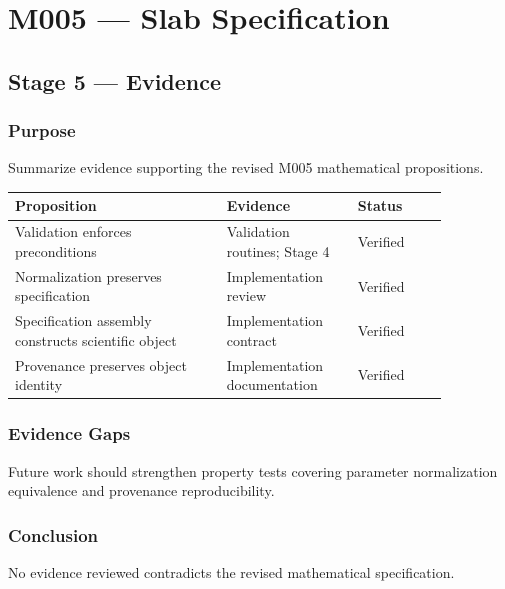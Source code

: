 \chapter{M005 --- Slab Specification}

\section{Stage 5 --- Evidence}

\subsection{Purpose}
Summarize evidence supporting the revised M005 mathematical propositions.

\begin{tabular}{|p{0.42\linewidth}|p{0.26\linewidth}|p{0.18\linewidth}|}
\hline
Proposition & Evidence & Status\\
\hline
Validation enforces preconditions & Validation routines; Stage 4 & Verified\\
Normalization preserves specification & Implementation review & Verified\\
Specification assembly constructs scientific object & Implementation contract & Verified\\
Provenance preserves object identity & Implementation documentation & Verified\\
\hline
\end{tabular}

\subsection{Evidence Gaps}

Future work should strengthen property tests covering parameter
normalization equivalence and provenance reproducibility.

\subsection{Conclusion}

No evidence reviewed contradicts the revised mathematical specification.
